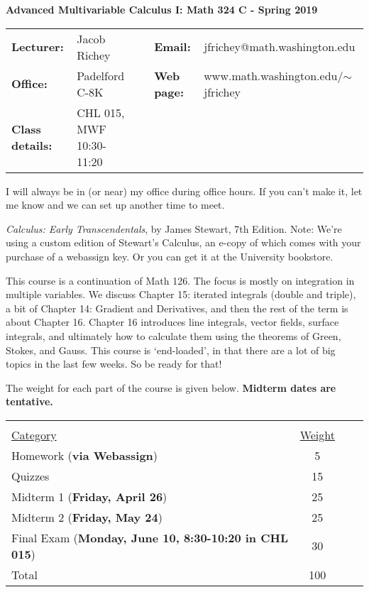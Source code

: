 \documentclass[11 pt]{report}
\begin{document}
\centerline{\bf Advanced Multivariable Calculus I: Math 324 C - Spring 2019}
\vspace{0.2cm}
\begin{tabular}{lllll}
{\bf Lecturer: } & Jacob Richey &  & {\bf Email: }       & jfrichey@math.washington.edu \\
{\bf Office: }& Padelford C-8K        &  & {\bf Web page: }    & www.math.washington.edu/$\sim$jfrichey \\
{\bf Class details:} & CHL 015, MWF 10:30-11:20 \hfill \\
\end{tabular}
\vspace{0.25cm}

 I will always be in (or near) my office during office hours. If you can't make it, let me know and we can set up another time to meet.  \vspace{0.25cm}

 \emph{Calculus: Early Transcendentals}, by James Stewart, 7th
Edition. Note: We're using a custom edition of Stewart's Calculus,
an e-copy of which comes with your purchase of a webassign key. Or you can get it
at the University bookstore. 

\vspace{0.25cm}

  This course is a continuation of
Math 126.  The focus is mostly on integration in multiple variables.
We discuss Chapter 15: iterated integrals (double and triple), a bit
of Chapter 14: Gradient and Derivatives, and then the rest of the
term is about Chapter 16.  Chapter 16 introduces line integrals,
vector fields, surface integrals, and ultimately how to calculate
them using the theorems of Green, Stokes, and Gauss.  This course is
`end-loaded', in that there are a lot of big topics in the last few
weeks.  So be ready for that!

\vspace{0.25cm}

 The weight for each part of the course is given
below. \textbf{Midterm dates are tentative.}

\vspace{-.25in}

\begin{center}\begin{tabular}{lccl} &  \\
\underline{Category} & \underline{Weight}  \\
Homework   ({\bf via Webassign})                 & 5  \\
Quizzes  & 15 \\
Midterm 1  ({\bf Friday, April 26})                   & 25  \\
Midterm 2  ({\bf Friday, May 24})                   & 25   \\
Final Exam ({\bf Monday, June 10, 8:30-10:20 in CHL 015})                        & 30  \\
\hline Total                                        & 100
\end{tabular}
\end{center}
\end{document}
